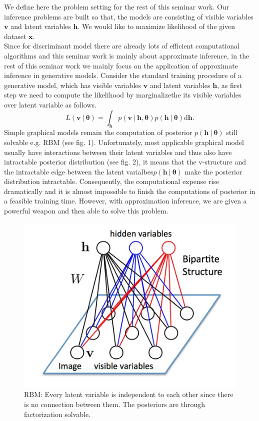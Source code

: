 \documentclass[conference]{IEEEtran}
\begin{document}
We define here the problem setting for the rest of this seminar work. Our inference problems are built so that, the models are consisting of visible variables $\boldsymbol{v}$ and latent variables $\boldsymbol{h}$. We would like to maximize likelihood of the given dataset $\boldsymbol{x}$.\\

Since for discriminant model there are already lots of efficient computational algorithms and this seminar work is mainly about approximate inference, in the rest of this seminar work we mainly focus on the application of approximate inference in generative models. Consider the standard training procedure of a generative model, which has visible variables $\boldsymbol{v}$ and latent variables $\boldsymbol{h}$, as first step we need to compute the likelihood by marginalizethe its visible variables over latent variable as follows.
\begin{equation}
  L(\boldsymbol{v}\ |\ \boldsymbol{\theta}) = \int_{\boldsymbol{h}}p(\boldsymbol{v} \ |\ \boldsymbol{h}, \boldsymbol{\theta})p(\boldsymbol{h}\ |\ \boldsymbol{\theta})\mathrm{d}\boldsymbol{h}.
\end{equation}
Simple graphical models remain the computation of posterior $p(\boldsymbol{h}\ |\ \boldsymbol{\theta})$ still solvable e.g. RBM (see fig. 1). Unfortunately, most applicable graphical model usually have interactions between their latent variables and thus also have intractable posterior distribution (see fig. 2), it means that the v-structure and the intractable edge between the latent varialbes$p(\boldsymbol{h}\ |\ \boldsymbol{\theta})$ make the posterior distribution intractable. Consequently, the computational expense rise dramatically and it is almost impossible to finish the computations of posterior in a feasible training time. However, with approximation inference, we are given a powerful weapon and then able to solve this problem.
\begin{figure}[ht]
	\centering
	\includegraphics[scale=0.8]{picture1.png}
     \caption{RBM: Every latent variable is independent to each other since there is no connection between them. The posteriors are through factorization solvable.}\label{pic_1}
\end{figure}
\end{document}
